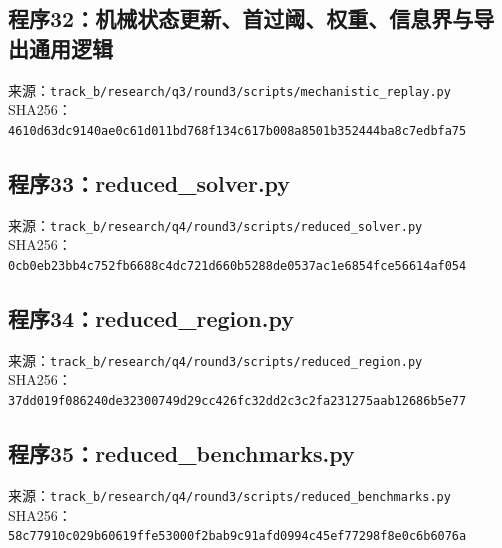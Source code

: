 \subsection*{程序32：机械状态更新、首过阈、权重、信息界与导出通用逻辑}
\noindent 来源：\nolinkurl{track_b/research/q3/round3/scripts/mechanistic_replay.py}\\
\noindent SHA256：\texttt{4610d63dc9140ae0c61d011bd768f134}\allowbreak\texttt{c617b008a8501b352444ba8c7edbfa75}\\
\clearpage
\subsection*{程序33：reduced\_solver.py}
\noindent 来源：\nolinkurl{track_b/research/q4/round3/scripts/reduced_solver.py}\\
\noindent SHA256：\texttt{0cb0eb23bb4c752fb6688c4dc721d660}\allowbreak\texttt{b5288de0537ac1e6854fce56614af054}\\
\clearpage
\subsection*{程序34：reduced\_region.py}
\noindent 来源：\nolinkurl{track_b/research/q4/round3/scripts/reduced_region.py}\\
\noindent SHA256：\texttt{37dd019f086240de32300749d29cc426}\allowbreak\texttt{fc32dd2c3c2fa231275aab12686b5e77}\\
\clearpage
\subsection*{程序35：reduced\_benchmarks.py}
\noindent 来源：\nolinkurl{track_b/research/q4/round3/scripts/reduced_benchmarks.py}\\
\noindent SHA256：\texttt{58c77910c029b60619ffe53000f2bab9}\allowbreak\texttt{c91afd0994c45ef77298f8e0c6b6076a}\\
\clearpage
